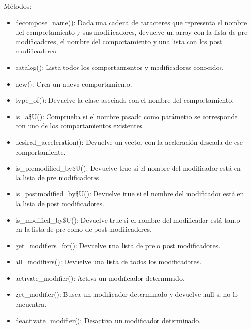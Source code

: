 Métodos:
\begin{itemize}
\item decompose\_name():
Dada una cadena de caracteres que representa el nombre del comportamiento y sus modificadores, devuelve un array con la lista de pre
modificadores, el nombre del comportamiento y una lista con los post modificadores.

\item catalog():
Lista todos los comportamientos y modificadores conocidos.

\item new():
Crea un nuevo comportamiento.

\item type\_of():
Devuelve la clase asociada con el nombre del comportamiento.

\item is\_a\$U():
Comprueba si el nombre pasado como parámetro se corresponde con uno de los comportamientos existentes.

\item desired\_acceleration():
Devuelve un vector con la aceleración deseada de ese comportamiento.

\item is\_premodified\_by\$U():
Devuelve true si el nombre del modificador está en la lista de pre modificadores

\item is\_postmodified\_by\$U():
Devuelve true si el nombre del modificador está en la lista de post modificadores.

\item is\_modified\_by\$U():
Devuelve true si el nombre del modificador está tanto en la lista de pre como de post modificadores.

\item get\_modifiers\_for():
Devuelve una lista de pre o post modificadores.

\item all\_modifiers():
Devuelve una lista de todos los modificadores.

\item activate\_modifier():
Activa un modificador determinado.

\item get\_modifier():
Busca un modificador determinado y devuelve null si no lo encuentra.

\item deactivate\_modifier():
Desactiva un modificador determinado.
\end{itemize}


